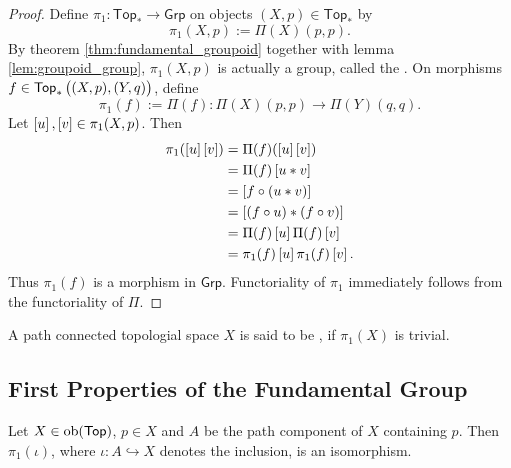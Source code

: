 \begin{proof}
	Define $\pi_1 : \mathsf{Top}_\ast \to \mathsf{Grp}$ on objects $(X,p) \in \mathsf{Top}_\ast$ by 
	\begin{equation*}
		\pi_1(X,p) := \Pi(X)(p,p).
	\end{equation*}
	By theorem \ref{thm:fundamental_groupoid} together with lemma \ref{lem:groupoid_group}, $\pi_1(X,p)$ is actually a group, called the . On morphisms $f \in \mathsf{Top}_\ast\del[1]{(X,p),(Y,q)}$, define 
	\begin{equation*}
		\pi_1(f) := \Pi(f) : \Pi(X)(p,p) \to \Pi(Y)(q,q).
	\end{equation*}
	Let $\sbr{u},\sbr{v} \in \pi_1(X,p)$. Then 
	\begin{align*}
		\pi_1(\sbr{u}\sbr{v}) &= \Pi(f)(\sbr{u}\sbr{v})\\
		&= \Pi(f)\sbr{u \ast v}\\
		&= \sbr[0]{f \circ (u \ast v)}\\
		&= \sbr[0]{(f \circ u) \ast (f \circ v)}\\
		&= \Pi(f)\sbr{u} \Pi(f)\sbr{v}\\
		&= \pi_1(f)\sbr{u}\pi_1(f)\sbr{v}.
	\end{align*}
	Thus $\pi_1(f)$ is a morphism in $\mathsf{Grp}$. Functoriality of $\pi_1$ immediately follows from the functoriality of $\Pi$.
\end{proof}

\begin{definition}
	A path connected topologial space $X$ is said to be , if $\pi_1(X)$ is trivial.
\end{definition}

\subsection*{First Properties of the Fundamental Group}
\begin{lemma}
	Let $X \in \operatorname{ob}(\mathsf{Top})$, $p \in X$ and $A$ be the path component of $X$ containing $p$. Then $\pi_1(\iota)$, where $\iota : A \hookrightarrow X$ denotes the inclusion, is an isomorphism.
\end{lemma}

